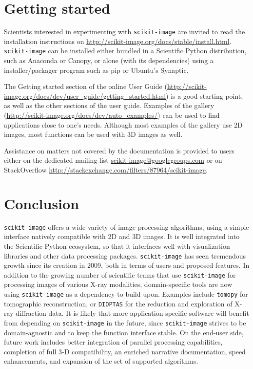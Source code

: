 \documentclass[twocolumn]{bmcart}%
\begin{document}
\section*{Getting started}

Scientists interested in experimenting with \texttt{scikit-image} are
invited to read the installation instructions on
\url{http://scikit-image.org/docs/stable/install.html}.
\texttt{scikit-image} can be installed either bundled in a Scientific
Python distribution, such as Anaconda or Canopy, or alone (with its
dependencies) using a installer/packager program such as pip or Ubuntu's
Synaptic.

The Getting started section of the online User Guide
(\url{http://scikit-image.org/docs/dev/user_guide/getting_started.html})
is a good starting point, as well as the other sections of the user
guide. Examples of the gallery
(\url{http://scikit-image.org/docs/dev/auto_examples/}) can be used to
find applications close to one's needs. Although most examples of the
gallery use 2D images, most functions can be used with 3D images as well.

Assistance on matters not covered by the documentation is provided to
users either on the dedicated mailing-list
\url{scikit-image@googlegroups.com} or on StackOverflow
\url{http://stackexchange.com/filters/87964/scikit-image}.

\section*{Conclusion}

\texttt{scikit-image} offers a wide variety of image processing
algorithms, using a simple interface natively compatible with 2D and 3D
images. It is well integrated into the Scientific Python ecosystem, so
that it interfaces well with visualization libraries and other data
processing packages. \texttt{scikit-image} has seen tremendous growth
since its creation in 2009, both in terms of users and proposed features.
In addition to the growing number of scientific teams that use
\texttt{scikit-image} for processing images of various X-ray modalities,
domain-specific tools are now using \texttt{scikit-image} as a dependency
to build upon. Examples include \texttt{tomopy} \citep{Gursoy2014} for
tomographic reconstruction, or \texttt{DIOPTAS} \citep{Prescher2015} for
the reduction and exploration of X-ray diffraction data. It is likely
that more application-specific software will benefit from depending on
\texttt{scikit-image} in the future, since \texttt{scikit-image} strives
to be domain-agnostic and to keep the function interface stable. On the end-user
side, future work includes better integration of parallel processing
capabilities, completion of full 3-D compatibility, an enriched narrative
documentation, speed enhancements, and expansion of the set of supported algorithms.
\end{document}
